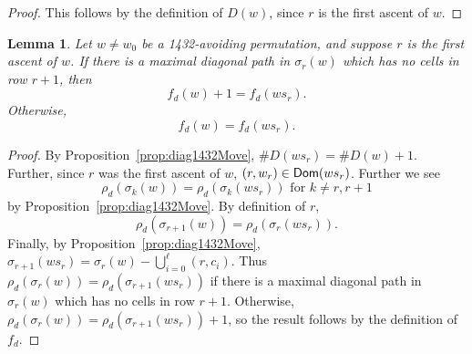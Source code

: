 \documentclass[12pt]{amsart}
\newtheorem{lemma}[theorem]{Lemma}
\theoremstyle{definition}
\theoremstyle{remark}
\numberwithin{equation}{section}
\newcommand{\maxsizediag}{\rho_d}
\newcommand{\diagstat}{f_d}
\begin{document}
 \begin{proof}
 This follows by the definition of $D(w)$, since $r$ is the first ascent of $w$.
\end{proof}



\begin{lemma}
	\label{lemma:maxdiag}
	Let $w\neq w_0$ be a 1432-avoiding permutation, and suppose $r$ is the first ascent of $w$.  If there is a maximal diagonal path in $\sigma_r(w)$ which has no cells in row $r+1$, then
	\[\diagstat(w)+1=\diagstat(ws_r).\]  Otherwise, \[\diagstat(w)=\diagstat(ws_r).\]
\end{lemma}
\begin{proof}
    By Proposition~\ref{prop:diag1432Move}, $\#D(ws_r)=\#D(w)+1$. Further, since $r$ was the first ascent of $w$, $(r,w_r)\in{\sf Dom}(ws_r)$. 
    Further we see 
    \[\maxsizediag(\sigma_k(w))=\maxsizediag(\sigma_k(ws_r)) \text{ for } k\neq r,r+1\] by Proposition~\ref{prop:diag1432Move}. By definition of $r$, \[\maxsizediag(\sigma_{r+1}(w))=\maxsizediag(\sigma_{r}(ws_r)).\] Finally, by Proposition~\ref{prop:diag1432Move}, $\sigma_{r+1}(ws_r)=\sigma_{r}(w)- \bigcup_{i=0}^{\ell} (r,c_i)$. Thus $\maxsizediag(\sigma_{r}(w))=\maxsizediag(\sigma_{r+1}(ws_r))$ if 
    there is a maximal diagonal path in $\sigma_r(w)$ which has no cells in row $r+1$. Otherwise, $\maxsizediag(\sigma_{r}(w))=\maxsizediag(\sigma_{r+1}(ws_r))+1$, so the result follows by the definition of $\diagstat$.
\end{proof}
\end{document}
